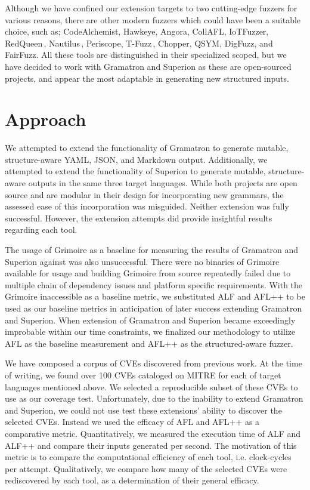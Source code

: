 \documentclass[12pt]{diazessay}
\begin{document}
Although we have confined our extension targets to two cutting-edge fuzzers for various reasons, there are other modern fuzzers which could have been a suitable choice, such as; CodeAlchemist\cite{CodeAlchemist1}\cite{CodeAlchemist2}, Hawkeye\cite{Hawkeye}, Angora\cite{Angora1}\cite{Angora2}, CollAFL\cite{CollAFL}, IoTFuzzer\cite{IoTFuzzer}, RedQueen\,\cite{redqueen}, Nautilus\,\cite{Nautilus1}\cite{Nautilus2}, Periscope\cite{PeriScope1}\cite{PeriScope2}, T-Fuzz\,\cite{TFuzz1}\cite{TFuzz2}, Chopper\cite{Chopper}, QSYM\cite{QSYM1}\cite{QSYM2}, DigFuzz\cite{DigFuzz}, and FairFuzz\cite{FairFuzz1}\cite{FairFuzz2}.
All these tools are distinguished in their specialized scoped, but we have decided to work with Gramatron and Superion as these are open-sourced projects, and appear the most adaptable in generating new structured inputs.


\vspace{3mm}
\section*{Approach}

We attempted to extend the functionality of Gramatron to generate mutable, structure-aware YAML, JSON, and Markdown output.
Additionally, we attempted to extend the functionality of Superion to generate mutable, structure-aware outputs in the same three target languages.
While both projects are open source and are modular in their design for incorporating new grammars, the assessed ease of this incorporation was misguided.
Neither extension was fully successful.
However, the extension attempts did provide insightful results regarding each tool.

The usage of Grimoire as a baseline for measuring the results of Gramatron and Superion against was also unsuccessful.
There were no binaries of Grimoire available for usage and building Grimoire from source repeatedly failed due to multiple chain of dependency issues and platform specific requirements.
With the Grimoire inaccessible as a baseline metric, we substituted ALF and AFL++ to be used as our baseline metrics in anticipation of later success extending Gramatron and Superion.
When extension of Gramatron and Superion became exceedingly improbable within our time constraints, we finalized our methodology to utilize AFL as the baseline measurement and AFL++ as the structured-aware fuzzer.

We have composed a corpus of CVEs discovered from previous work.
At the time of writing, we found over 100 CVEs cataloged on MITRE\cite{MITRE} for each of target languages mentioned above.
We selected a reproducible subset of these CVEs to use as our coverage test.
Unfortunately, due to the inability to extend Gramatron and Superion, we could not use test these extensions' ability to discover the selected CVEs.
Instead we used the efficacy of AFL and AFL++ as a comparative metric.
Quantitatively, we measured the execution time of ALF and ALF++ and compare their inputs generated per second.
The motivation of this metric is to compare the computational efficiency of each tool, i.e. clock-cycles per attempt.
Qualitatively, we compare how many of the selected CVEs were rediscovered by each tool, as a determination of their general efficacy.
\end{document}

